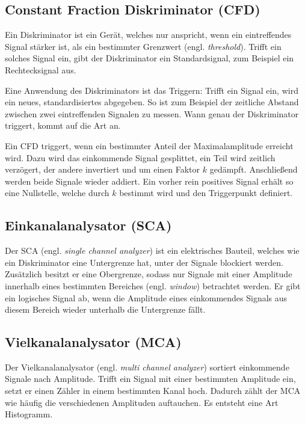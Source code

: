 \subsection{Constant Fraction Diskriminator (CFD)}

Ein Diskriminator ist ein Gerät, welches nur anspricht, wenn ein eintreffendes
Signal stärker ist, als ein bestimmter Grenzwert (engl. \emph{threshold}).
Trifft ein solches Signal ein, gibt der Diskriminator ein Standardsignal, zum
Beispiel ein Rechtecksignal aus.

Eine Anwendung des Diskriminators ist das Triggern: Trifft ein Signal ein, wird
ein neues, standardisiertes abgegeben. So ist zum Beispiel der zeitliche
Abstand zwischen zwei eintreffenden Signalen zu messen. Wann genau der
Diskriminator triggert, kommt auf die Art an.

Ein CFD triggert, wenn ein bestimmter Anteil der Maximalamplitude erreicht
wird. Dazu wird das einkommende Signal gesplittet, ein Teil wird zeitlich
verzögert, der andere invertiert und um einen Faktor $k$ gedämpft. Anschließend
werden beide Signale wieder addiert. Ein vorher rein positives Signal erhält so
eine Nullstelle, welche durch $k$ bestimmt wird und den Triggerpunkt definiert.

\subsection{Einkanalanalysator (SCA)}

Der SCA (engl. \emph{single channel analyzer}) ist ein elektrisches Bauteil,
welches wie ein Diskriminator eine Untergrenze hat, unter der Signale blockiert
werden. Zusätzlich besitzt er eine Obergrenze, sodass nur Signale mit einer
Amplitude innerhalb eines bestimmten Bereiches (engl. \emph{window}) betrachtet
werden. Er gibt ein logisches Signal ab, wenn die Amplitude eines einkommendes
Signals aus diesem Bereich wieder unterhalb die Untergrenze fällt.

\subsection{Vielkanalanalysator (MCA)}

Der Vielkanalanalysator (engl. \emph{multi channel analyzer}) sortiert
einkommende Signale nach Amplitude. Trifft ein Signal mit einer bestimmten
Amplitude ein, setzt er einen Zähler in einem bestimmten Kanal hoch. Dadurch
zählt der MCA wie häufig die verschiedenen Amplituden auftauchen. Es entsteht
eine Art Histogramm.

